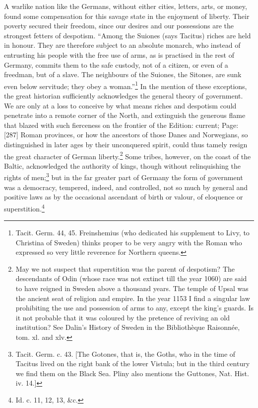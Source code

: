 A warlike nation like the Germans, without either cities, letters, arts, or money, found some compensation for this savage state in the enjoyment of liberty. Their poverty secured their freedom, since our desires and our possessions are the strongest fetters of despotism. \texthebrew{“}Among the Suiones (says Tacitus) riches are held in honour. They are therefore subject to an absolute monarch, who instead of entrusting his people with the free use of arms, as is practised in the rest of Germany, commits them to the safe custody, not of a citizen, or even of a freedman, but of a slave. The neighbours of the Suiones, the Sitones, are sunk even below servitude; they obey a woman.\texthebrew{}”\footnote{Tacit. Germ. 44, 45. Freinshemius (who dedicated his supplement to Livy, to Christina of Sweden) thinks proper to be very angry with the Roman who expressed so very little reverence for Northern queens.} In the mention of these exceptions, the great historian sufficiently acknowledges the general theory of government. We are only at a loss to conceive by what means riches and despotism could penetrate into a remote corner of the North, and extinguish the generous flame that blazed with such fierceness on the frontier of the Edition: current; Page: [287] Roman provinces, or how the ancestors of those Danes and Norwegians, so distinguished in later ages by their unconquered spirit, could thus tamely resign the great character of German liberty.\footnote{May we not suspect that superstition was the parent of despotism? The descendants of Odin (whose race was not extinct till the year 1060) are said to have reigned in Sweden above a thousand years. The temple of Upsal was the ancient seat of religion and empire. In the year 1153 I find a singular law prohibiting the use and possession of arms to any, except the king\texthebrew{}’s guards. Is it not probable that it was coloured by the pretence of reviving an old institution? See Dalin\texthebrew{}’s History of Sweden in the Bibliothèque Raisonnée, tom. xl. and xlv.} Some tribes, however, on the coast of the Baltic, acknowledged the authority of kings, though without relinquishing the rights of men;\footnote{Tacit. Germ. c. 43. [The Gotones, that is, the Goths, who in the time of Tacitus lived on the right bank of the lower Vistula; but in the third century we find them on the Black Sea. Pliny also mentions the Guttones, Nat. Hist. iv. 14.]} but in the far greater part of Germany the form of government was a democracy, tempered, indeed, and controlled, not so much by general and positive laws as by the occasional ascendant of birth or valour, of eloquence or superstition.\footnote{Id. c. 11, 12, 13, \&c.}

